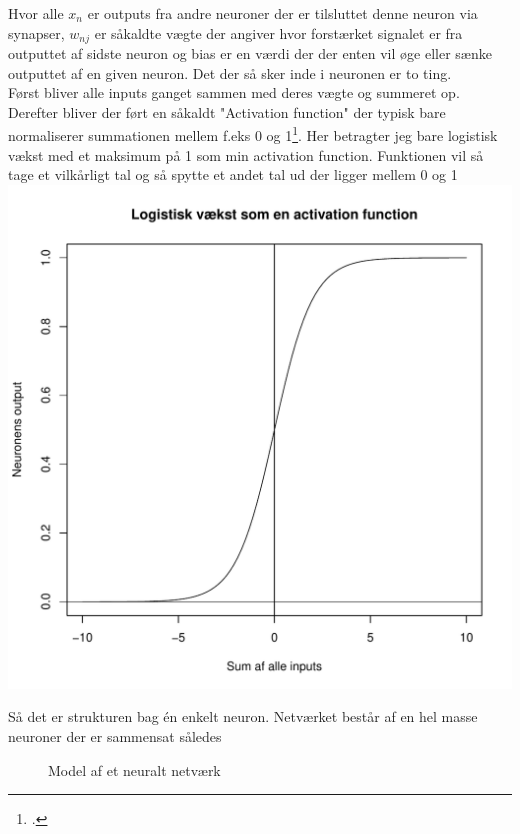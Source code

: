 Hvor alle $x_n$ er outputs fra andre neuroner der er tilsluttet denne neuron via synapser, $w_{nj}$ er såkaldte vægte der angiver hvor
forstærket signalet er fra outputtet af sidste neuron og bias er en værdi der der enten vil øge eller
sænke outputtet af en given neuron. Det der så sker inde i neuronen er to ting. \\
Først bliver alle inputs ganget sammen med deres vægte og summeret op. \\
Derefter bliver der ført en såkaldt "Activation function" der typisk bare normaliserer
summationen mellem f.eks 0 og 1\footcite{ANN11}. Her betragter jeg bare logistisk vækst med et maksimum på 1 som min activation function.
Funktionen vil så tage et vilkårligt tal og så spytte et andet tal ud der ligger mellem 0 og 1
\includegraphics[width=\textwidth]{diagrammer/sigmoid.pdf}

Så det er strukturen bag én enkelt neuron. Netværket består af en hel masse neuroner der er sammensat således

\begin{figure}
\label{netvaerk}
\caption{Model af et neuralt netværk}

\end{figure}

